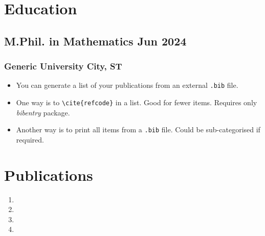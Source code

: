 \documentclass[11pt]{article}
\begin{document}
\section{Education}
\subsection{M.Phil. in Mathematics \hfill Jun 2024}
\subsubsection{Generic University \hfill City, ST}
\begin{itemize}
  \item You can generate a list of your publications from an external \texttt{.bib} file.
  \item One way is to \verb|\cite{refcode}| in a list. Good for fewer items. Requires only \textit{bibentry} package.
  \item Another way is to print all items from a \texttt{.bib} file. Could be sub-categorised if required.
\end{itemize}

\section{Publications}


\begin{enumerate}
  \item {}
  \item {}
  \item {}
  \item {}
\end{enumerate}
\end{document}
